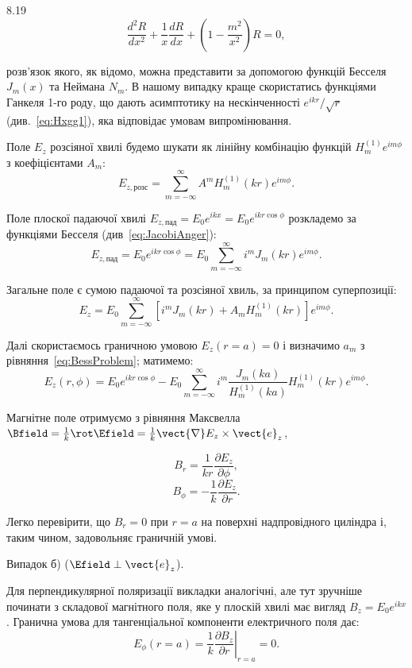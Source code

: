 \begin{Solution}{8.{19}}
\begin{equation}\label{eq:BessProblem}\tag{*}
		\frac{d^2R}{dx^2} + \frac1x\frac{dR}{dx} + \left(1 - \frac{m^2}{x^2} \right) R = 0,
\end{equation}

	розв'язок якого, як відомо, можна представити за допомогою функцій Бесселя $J_m(x)$ та Неймана $N_m$.
    В нашому випадку краще скористатись функціями Ганкеля 1-го роду, що дають асимптотику на нескінченності $e^{ikr}/\sqrt{r}$ (див.~\eqref{eq:Hxgg1}), яка відповідає умовам випромінювання.

    Поле  $E_z$ розсіяної хвилі будемо шукати як  лінійну комбінацію функцій $H_m^{(1)}e^{im\phi}$ з коефіцієнтами $A_m$:
	\[
		E_{z,\text{розс}} =  \sum\limits_{m = -\infty}^{\infty} A^m H^{(1)}_m(k r)e^{im\phi}.
	\]

	Поле плоскої падаючої хвилі $ E_{z,\text{пад}} = E_0e^{ikx} = E_0e^{ikr\cos\phi}$ розкладемо за функціями Бесселя (див~\eqref{eq:JacobiAnger}):
	\[
		E_{z,\text{пад}} =  E_0e^{ikr\cos\phi} =  E_0 \sum\limits_{m = -\infty}^{\infty} i^m J_m(k r)e^{im\phi}.
	\]

	Загальне поле є сумою падаючої та розсіяної хвиль, за принципом суперпозиції:
	\[
		E_z = E_0 \sum\limits_{m = -\infty}^{\infty}[ i^mJ_m(kr) + A_mH^{(1)}_m(kr)]e^{im\phi}.
	\]

	Далі скористаємось граничною умовою $E_z(r = a) = 0$  і визначимо $a_m$ з рівняння~\eqref{eq:BessProblem}; матимемо:
	\[
		E_z(r,\phi) = E_0e^{ikr\cos\phi} - E_0\sum\limits_{m = -\infty}^{\infty} i^m \frac{J_m(ka)}{H_m^{(1)}(ka)}H_m^{(1)}(kr)e^{im\phi}.
	\]

    Магнітне поле отримуємо з рівняння Максвелла $\Bfield = \frac1k\rot\Efield = \frac1k \vect{\nabla}E_z\times \vect{e}_z$,

    \[
        B_r=\frac{1}{kr}\frac{\partial E_z}{\partial \phi},
    \]
    \[
        B_\phi=-\frac{1}{k}\frac{\partial E_z}{\partial r}.
    \]

    Легко  перевірити, що $B_r=0$ при $r=a$ на  поверхні надпровідного циліндра і, таким чином, задовольняє граничній умові.

    Випадок б) ($\Efield \perp \vect{e}_z$).

	Для перпендикулярної поляризації викладки аналогічні, але тут зручніше починати з складової магнітного поля, яке у плоскій хвилі має вигляд $B_z = E_0e^{ikx}$. Гранична умова для тангенціальної компоненти електричного поля дає:
	\[
		E_{\phi}(r = a) = \left. \frac1k\frac{\partial B_z}{\partial r}\right|_{r = a} = 0.
	\]


\end{Solution}
